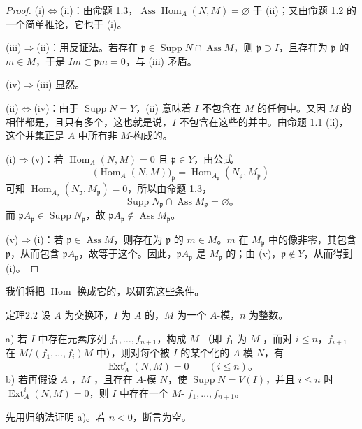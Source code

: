 \begin{proof}
(i)$\Leftrightarrow$(ii)：由命题 1.3，$\operatorname{Ass}\operatorname{Hom}_A(N,M)=\varnothing$ 于 (ii)；又由命题 1.2 的一个简单推论，它也于 (i)。

(iii)$\Rightarrow$(ii)：用反证法。若存在 $\mathfrak p\in\operatorname{Supp}N\cap\operatorname{Ass}M$，则 $\mathfrak p\supset I$，且存在为 $\mathfrak p$ 的 $m\in M$，于是 $Im\subset\mathfrak pm=0$，与 (iii) 矛盾。

(iv)$\Rightarrow$(iii) 显然。

(ii)$\Leftrightarrow$(iv)：由于 $\operatorname{Supp}N=Y$，(ii) 意味着 $I$ 不包含在 $M$ 的任何中。又因 $M$ 的相伴都是，且只有多个，这也就是说，$I$ 不包含在这些的并中。由命题 1.1 (ii)，这个并集正是 $A$ 中所有非 $M$-构成的。

(i)$\Rightarrow$(v)：若 $\operatorname{Hom}_A(N,M)=0$ 且 $\mathfrak p\in Y$，由公式
\[
\bigl(\operatorname{Hom}_A(N,M)\bigr)_{\mathfrak p}
=\operatorname{Hom}_{A_{\mathfrak p}}(N_{\mathfrak p},M_{\mathfrak p})
\]
可知 $\operatorname{Hom}_{A_{\mathfrak p}}(N_{\mathfrak p},M_{\mathfrak p})=0$，所以由命题 1.3，
\[
\operatorname{Supp}N_{\mathfrak p}\cap\operatorname{Ass}M_{\mathfrak p}
=\varnothing。
\]
而 $\mathfrak pA_{\mathfrak p}\in\operatorname{Supp}N_{\mathfrak p}$，故 $\mathfrak pA_{\mathfrak p}\notin\operatorname{Ass}M_{\mathfrak p}$。

(v)$\Rightarrow$(i)：若 $\mathfrak p\in\operatorname{Ass}M$，则存在为 $\mathfrak p$ 的 $m\in M$。$m$ 在 $M_{\mathfrak p}$ 中的像非零，其包含 $\mathfrak p$，从而包含 $\mathfrak pA_{\mathfrak p}$，故等于这个。因此，$\mathfrak pA_{\mathfrak p}$ 是 $M_{\mathfrak p}$ 的；由 (v)，$\mathfrak p\notin Y$，从而得到 (i)。
\end{proof}
我们将把 $\operatorname{Hom}$ 换成它的，以研究这些条件。
\begin{SGAresult}{定理}{2.2}
设 $A$ 为交换环，$I$ 为 $A$ 的，$M$ 为一个 $A$-模，$n$ 为整数。

a) 若 $I$ 中存在元素序列 $f_1,\ldots,f_{n+1}$，构成 $M$-（即 $f_1$ 为 $M$-，而对 $i\le n$，$f_{i+1}$ 在 $M/(f_1,\ldots,f_i)M$ 中），则对每个被 $I$ 的某个化的 $A$-模 $N$，有
\[
\operatorname{Ext}_A^i(N,M)=0\qquad(i\le n)。
\]
b) 若再假设 $A$ ，$M$ ，且存在 $A$-模 $N$，使 $\operatorname{Supp}N=V(I)$，并且 $i\le n$ 时 $\operatorname{Ext}_A^i(N,M)=0$，则 $I$ 中存在一个 $M$- $f_1,\ldots,f_{n+1}$。
\end{SGAresult}
先用归纳法证明 a)。若 $n<0$，断言为空。

